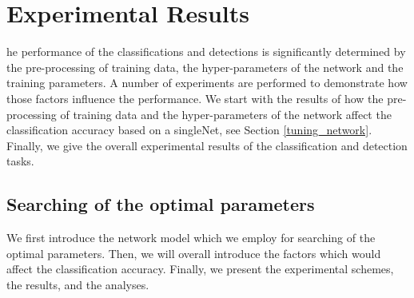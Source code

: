 %
%
\let\textcircled=\pgftextcircled
\chapter{Experimental Results}
\label{chap5}
he performance of the classifications and detections is significantly determined by the pre-processing of training data,  the hyper-parameters of the network and the training parameters. A number of experiments are performed to demonstrate how those factors influence the performance. We start with the results of how the pre-processing of training data and the hyper-parameters of the network affect the classification accuracy based on a singleNet, see Section \ref{tuning_network}. Finally, we give the overall experimental results of the classification and detection tasks.
  
\section{Searching of the optimal parameters}
We first introduce the network model which we employ for searching of the optimal parameters.  Then, we will overall introduce the factors which would affect the classification accuracy. Finally, we present the experimental schemes, the results, and the analyses. 
